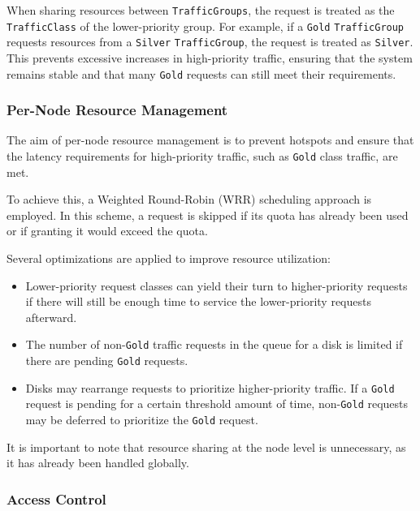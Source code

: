 When sharing resources between \texttt{TrafficGroups}, the request is treated as the \texttt{TrafficClass} of the lower-priority group. For example, if a \texttt{Gold} \texttt{TrafficGroup} requests resources from a \texttt{Silver} \texttt{TrafficGroup}, the request is treated as \texttt{Silver}. This prevents excessive increases in high-priority traffic, ensuring that the system remains stable and that many \texttt{Gold} requests can still meet their requirements.

\subsubsection{Per-Node Resource Management}\label{sec:per_node_resource_management}

The aim of per-node resource management is to prevent hotspots and ensure that the latency requirements for high-priority traffic, such as \texttt{Gold} class traffic, are met.

To achieve this, a Weighted Round-Robin (WRR) scheduling approach is employed. In this scheme, a request is skipped if its quota has already been used or if granting it would exceed the quota.

Several optimizations are applied to improve resource utilization:

\begin{itemize}
    \item Lower-priority request classes can yield their turn to higher-priority requests if there will still be enough time to service the lower-priority requests afterward.
    \item The number of non-\texttt{Gold} traffic requests in the queue for a disk is limited if there are pending \texttt{Gold} requests.
    \item Disks may rearrange requests to prioritize higher-priority traffic. If a \texttt{Gold} request is pending for a certain threshold amount of time, non-\texttt{Gold} requests may be deferred to prioritize the \texttt{Gold} request.
\end{itemize}

It is important to note that resource sharing at the node level is unnecessary, as it has already been handled globally.

\subsubsection{Access Control}\label{sec:access_control}

